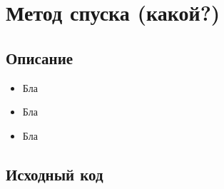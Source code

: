 \documentclass[../../report.tex]{subfiles}
\begin{document}
\chapter{Метод спуска (какой?)}

\section{Описание}
\begin{itemize}
    \item Бла
    \item Бла
    \item Бла
\end{itemize}

\section{Исходный код}
\end{document}
